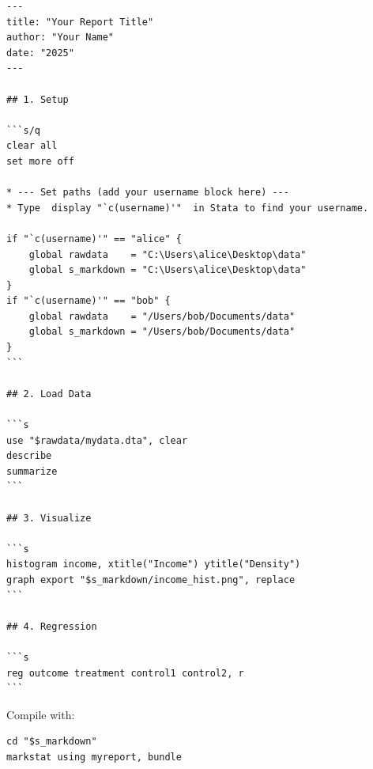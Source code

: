 \documentclass[paper=a4, fontsize=11pt]{scrartcl}
\begin{document}
\begin{lstlisting}[style=stata]
---
title: "Your Report Title"
author: "Your Name"
date: "2025"
---

## 1. Setup

```s/q
clear all
set more off

* --- Set paths (add your username block here) ---
* Type  display "`c(username)'"  in Stata to find your username.

if "`c(username)'" == "alice" {
    global rawdata    = "C:\Users\alice\Desktop\data"
    global s_markdown = "C:\Users\alice\Desktop\data"
}
if "`c(username)'" == "bob" {
    global rawdata    = "/Users/bob/Documents/data"
    global s_markdown = "/Users/bob/Documents/data"
}
```

## 2. Load Data

```s
use "$rawdata/mydata.dta", clear
describe
summarize
```

## 3. Visualize

```s
histogram income, xtitle("Income") ytitle("Density")
graph export "$s_markdown/income_hist.png", replace
```

## 4. Regression

```s
reg outcome treatment control1 control2, r
```
\end{lstlisting}

\medskip
Compile with:

\begin{lstlisting}[style=stata]
cd "$s_markdown"
markstat using myreport, bundle
\end{lstlisting}
\end{document}
